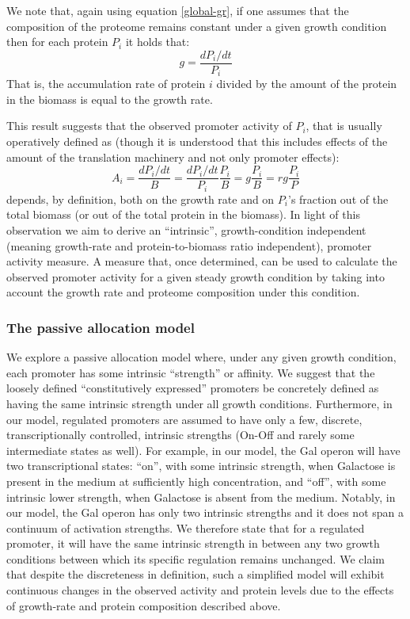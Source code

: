 \documentclass[a4page,notitlepage]{article}
\begin{document}
We note that, again using equation \ref{global-gr}, if one assumes that the composition of the proteome remains constant under a given growth condition then for each protein $P_i$ it holds that:
\[g=\frac{dP_i/dt}{P_i}\]
That is, the accumulation rate of protein $i$ divided by the amount of the protein in the biomass is equal to the growth rate.

This result suggests that the observed promoter activity of $P_i$, that is usually operatively defined as (though it is understood that this includes effects of the amount of the translation machinery and not only promoter effects):
\begin{equation}
\label{pa-gr-relation}
A_i=\frac{dP_i/dt}{B}=\frac{dP_i/dt}{P_i}\frac{P_i}{B}=g\frac{P_i}{B}=rg\frac{P_i}{P}
\end{equation}
depends, by definition, both on the growth rate and on $P_i$'s fraction out of the total biomass (or out of the total protein in the biomass).
In light of this observation we aim to derive an “intrinsic”, growth-condition independent (meaning growth-rate and protein-to-biomass ratio independent), promoter activity measure.
A measure that, once determined, can be used to calculate the observed promoter activity for a given steady growth condition by taking into account the growth rate and proteome composition under this condition.
\subsubsection{The passive allocation model}
We explore a passive allocation model where, under any given growth condition, each promoter has some intrinsic ``strength'' or affinity.
We suggest that the loosely defined ``constitutively expressed'' promoters be concretely defined as having the same intrinsic strength under all growth conditions.
Furthermore, in our model, regulated promoters are assumed to have only a few, discrete, transcriptionally controlled, intrinsic strengths (On-Off and rarely some intermediate states as well).
For example, in our model, the Gal operon will have two transcriptional states: ``on'', with some intrinsic strength, when Galactose is present in the medium at sufficiently high concentration, and ``off'', with some intrinsic lower strength, when Galactose is absent from the medium.
Notably, in our model, the Gal operon has only two intrinsic strengths and it does not span a continuum of activation strengths.
We therefore state that for a regulated promoter, it will have the same intrinsic strength in between any two growth conditions between which its specific regulation remains unchanged.
We claim that despite the discreteness in definition, such a simplified model will exhibit continuous changes in the observed activity and protein levels due to the effects of growth-rate and protein composition described above.
\end{document}

